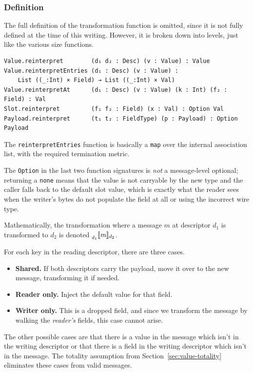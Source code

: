 \subsubsection{Definition}

The full definition of the transformation function is omitted, since it is not
fully defined at the time of this writing. However, it is broken down into
levels, just like the various size functions.

\begin{verbatim}
Value.reinterpret        (d₁ d₂ : Desc) (v : Value) : Value
Value.reinterpretEntries (d₁ : Desc) (v : Value) :
    List ((_:Int) × Field) → List ((_:Int) × Val)
Value.reinterpretAt      (d₁ : Desc) (v : Value) (k : Int) (f₂ : Field) : Val
Slot.reinterpret         (f₁ f₂ : Field) (x : Val) : Option Val
Payload.reinterpret      (t₁ t₂ : FieldType) (p : Payload) : Option Payload
\end{verbatim}

The \texttt{reinterpretEntries} function is basically a \texttt{map} over the
internal association list, with the required termination metric.

The \texttt{Option} in the last two function signatures is \emph{not} a
message-level optional; returning a \texttt{none} means that the value is not
carryable by the new type and the caller falls back to the default slot value,
which is exactly what the reader sees when the writer's bytes do not populate
the field at all or using the incorrect wire type.

Mathematically, the transformation where a message $m$ at descriptor $d_1$ is
transformed to $d_2$ is denoted $\prescript{}{d_1}{\llbracket{} m \rrbracket{}}_{d_2}$.

For each key in the reading descriptor, there are three cases.

\begin{itemize}
\item \textbf{Shared.} If both descriptors carry the payload, move it over to
  the new message, transforming it if needed.
\item \textbf{Reader only.} Inject the default value for that field.
\item \textbf{Writer only.} This is a dropped field, and since we transform the
  message by walking the \emph{reader's} fields, this case cannot arise.
\end{itemize}

The other possible cases are that there is a value in the message which isn't in
the writing descriptor or that there is a field in the writing descriptor which
isn't in the message. The totality assumption from
Section~\ref{sec:value-totality} eliminates these cases from valid messages.

